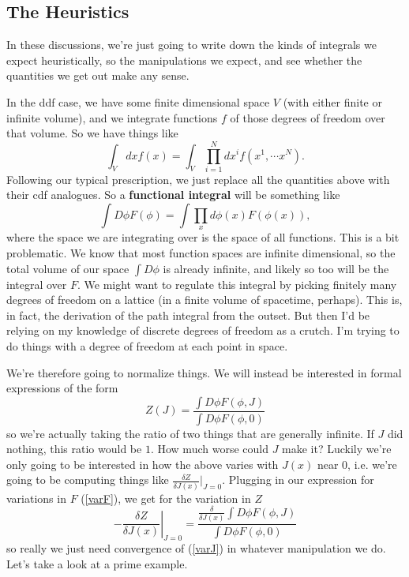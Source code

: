 \documentclass[main.tex]{subfiles}
\begin{document}
\subsection{The Heuristics}

In these discussions, we're just going to write down the kinds of integrals we expect heuristically, so the manipulations we expect, and see whether the quantities we get out make any sense.

In the ddf case, we have some finite dimensional space $V$ (with either finite or infinite volume), and we integrate functions $f$ of those degrees of freedom over that volume. So we have things like
\[
\int_{V} dx f(x) = \int_V \prod_{i=1}^N dx^i f(x^1,\cdots x^N).
\]
Following our typical prescription, we just replace all the quantities above with their cdf analogues. So a \textbf{functional integral} will be something like
\[
\int D \phi F(\phi) = \int \prod_x d \phi (x) F(\phi(x)),
\]
where the space we are integrating over is the space of all functions. This is a bit problematic. We know that most function spaces are infinite dimensional, so the total volume of our space $\int D \phi$ is already infinite, and likely so too will be the integral over $F$. We might want to regulate this integral by picking finitely many degrees of freedom on a lattice (in a finite volume of spacetime, perhaps). This is, in fact, the derivation of the path integral from the outset. But then I'd be relying on my knowledge of discrete degrees of freedom as a crutch. I'm trying to do things with a degree of freedom at each point in space.

We're therefore going to normalize things. We will instead be interested in formal expressions of the form
\[
Z(J) = \frac{\int D\phi F(\phi,J)}{\int D\phi F(\phi,0)}
\]
so we're actually taking the ratio of two things that are generally infinite. If $J$ did nothing, this ratio would be $1$. How much worse could $J$ make it? Luckily we're only going to be interested in how the above varies with $J(x)$ near 0, i.e. we're going to be computing things like $\frac{\delta Z}{\delta J(x)}\Big\vert_{J=0}$. Plugging in our expression for variations in $F$ (\ref{varF}), we get for the variation in $Z$
\begin{equation} \label{varJ}
-\left. \frac{\delta Z}{\delta J(x)} \right\vert_{J=0} = \frac{\frac{\delta}{\delta J(x)}\int D \phi F(\phi,J)
}{\int D \phi F(\phi,0)}
\end{equation}
so really we just need convergence of (\ref{varJ}) in whatever manipulation we do. Let's take a look at a prime example.
\end{document}
